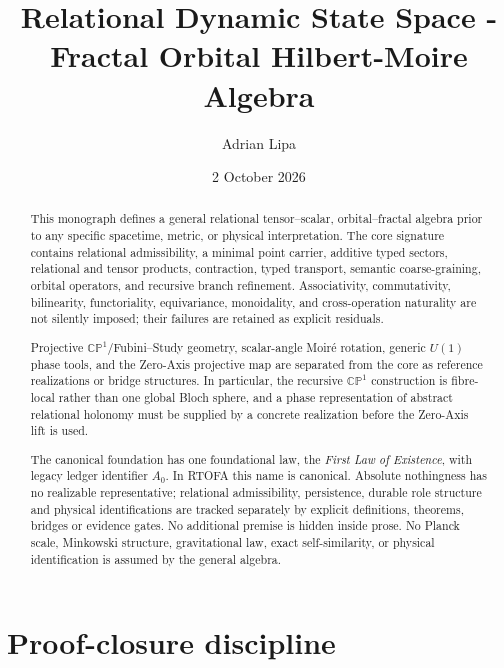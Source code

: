 \documentclass[11pt]{article}
\title{Relational Dynamic State Space - Fractal Orbital Hilbert-Moire Algebra}
\author{Adrian Lipa}
\date{2 October 2026}
\newcommand{\CP}{\mathbb{CP}^{1}}
\begin{document}
\maketitle

\begin{abstract}
This monograph defines a general relational tensor--scalar,
orbital--fractal algebra prior to any specific spacetime, metric, or physical
interpretation. The core signature contains relational admissibility, a
minimal point carrier, additive typed sectors, relational and tensor
products, contraction, typed transport, semantic coarse-graining, orbital
operators, and recursive branch refinement. Associativity, commutativity,
bilinearity, functoriality, equivariance, monoidality, and cross-operation
naturality are not silently imposed; their failures are retained as explicit
residuals.

Projective \(\CP\)/Fubini--Study geometry, scalar-angle Moir\'e rotation,
generic \(U(1)\) phase tools, and the Zero-Axis projective map are separated
from the core as reference realizations or bridge structures. In particular,
the recursive \(\CP\) construction is fibre-local rather than one global
Bloch sphere, and a phase representation of abstract relational holonomy must
be supplied by a concrete realization before the Zero-Axis lift is used.

The canonical foundation has one foundational law, the \emph{First Law of Existence},
with legacy ledger identifier \(A_0\). In RTOFA this name is canonical.
Absolute nothingness has no realizable representative; relational
admissibility, persistence, durable role structure and physical
identifications are tracked separately by explicit definitions, theorems,
bridges or evidence gates. No additional premise is hidden inside prose. No Planck scale, Minkowski structure, gravitational law, exact
self-similarity, or physical identification is assumed by the general
algebra.
\end{abstract}

\section*{Proof-closure discipline}
\end{document}
